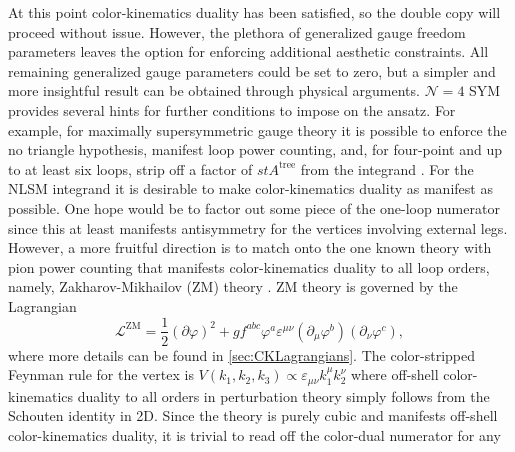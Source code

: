 \documentclass[11pt,letter]{article}
\newcommand{\atree}{\ensuremath{A^{\text{tree}}}}
\begin{document}

At this point color-kinematics duality has been satisfied, so the
double copy will proceed without issue.  However, the plethora of
generalized gauge freedom parameters leaves the option for enforcing
additional aesthetic constraints.  All remaining generalized gauge
parameters could be set to zero, but a simpler and more insightful
result can be obtained through physical arguments.  $\mathcal{N}=4$
SYM provides several hints for further conditions to impose on the
ansatz.  For example, for maximally supersymmetric gauge theory it is
possible to enforce the no triangle hypothesis, manifest loop power
counting, and, for four-point and up to at least six loops, strip off
a factor of $st \atree$ from the integrand \cite{FiveLoopN4,
  Bern:2012uf, Bern:2010fy, SuperSum, Carrasco:2021otn,
  JJHenrikReview, BRY, BDDPR, Neq44np}.  For the NLSM integrand it is
desirable to make color-kinematics duality as manifest as possible.
One hope would be to factor out some piece of the one-loop numerator
since this at least manifests antisymmetry for the vertices involving
external legs.  However, a more fruitful direction is to match onto
the one known theory with pion power counting that manifests
color-kinematics duality to all loop orders, namely,
Zakharov-Mikhailov (ZM) theory \cite{Zakharov:1973pp, Cheung:2022mix}.
ZM theory is governed by the Lagrangian
\begin{equation}
\label{eq:ZMLagrangian}
\mathcal{L}^{\text{ZM}} = \frac{1}{2}(\partial \varphi)^2
+ g f^{abc} \varphi^a \varepsilon^{\mu\nu}(\partial_\mu \varphi^b)( \partial_\nu \varphi^c),
\end{equation}
where more details can be found in \cref{sec:CKLagrangians}.  The
color-stripped Feynman rule for the vertex is
$V(k_1, k_2, k_3) \propto \varepsilon_{\mu\nu}k_1^\mu k_2^\nu$ where
off-shell color-kinematics duality to all orders in perturbation
theory simply follows from the Schouten identity in 2D.  Since the theory
is purely cubic and manifests off-shell color-kinematics
duality, it is trivial to read off the color-dual numerator for any
\end{document}
